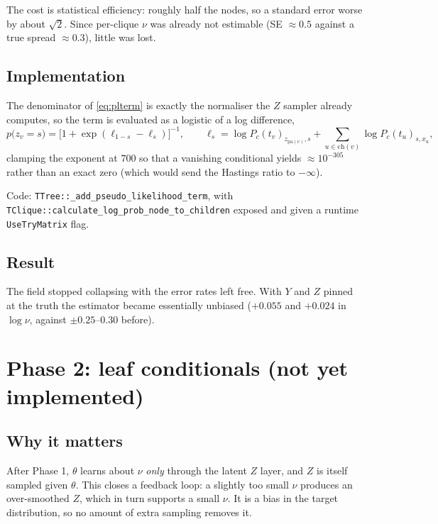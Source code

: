 \documentclass[11pt,a4paper]{article}
\newcommand{\Ys}{Y}
\newcommand{\pa}{\mathrm{pa}}
\newcommand{\ch}{\mathrm{ch}}
\begin{document}
The cost is statistical efficiency: roughly half the nodes, so a standard error worse by
about $\sqrt2$. Since per-clique $\nu$ was already not estimable (SE $\approx 0.5$ against a
true spread $\approx 0.3$), little was lost.

\subsection{Implementation}

The denominator of \eqref{eq:plterm} is exactly the normaliser the $Z$ sampler already
computes, so the term is evaluated as a logistic of a log difference,
\[
  p\bigl(z_v = s\bigr) = \bigl[1 + \exp(\ell_{1-s} - \ell_{s})\bigr]^{-1},
  \qquad
  \ell_s = \log P_c(t_v)_{z_{\pa(v)},s} + \sum_{u\in\ch(v)} \log P_c(t_u)_{s,x_u},
\]
clamping the exponent at $700$ so that a vanishing conditional yields $\approx 10^{-305}$
rather than an exact zero (which would send the Hastings ratio to $-\infty$).

Code: \texttt{TTree::\_add\_pseudo\_likelihood\_term}, with
\texttt{TClique::calculate\_log\_prob\_node\_to\_children} exposed and given a runtime
\texttt{UseTryMatrix} flag.

\subsection{Result}

The field stopped collapsing with the error rates left free. With $\Ys$ and $Z$ pinned at
the truth the estimator became essentially unbiased ($+0.055$ and $+0.024$ in $\log\nu$,
against $\pm0.25$--$0.30$ before).

\section{Phase 2: leaf conditionals (not yet implemented)}
\label{sec:phase2}

\subsection{Why it matters}

After Phase 1, $\theta$ learns about $\nu$ \emph{only} through the latent $Z$ layer, and $Z$
is itself sampled given $\theta$. This closes a feedback loop: a slightly too small $\nu$
produces an over-smoothed $Z$, which in turn supports a small $\nu$. It is a bias in the
target distribution, so no amount of extra sampling removes it.
\end{document}
